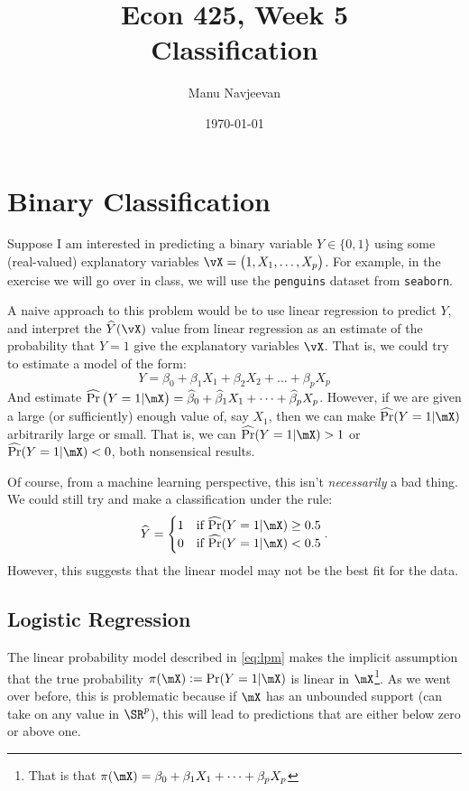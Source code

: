 \documentclass[10pt]{article}
\title{Econ 425, Week 5 \\ \Large Classification}%
\author{Manu Navjeevan}
\date{\today}
\begin{document}
\maketitle

\section{Binary Classification}%
\label{sec:binary}

Suppose I am interested in predicting a binary variable \(Y \in \{0,1\} \) using some (real-valued) explanatory variables \(\vX = \left(1, X_1,\dots,X_p\right)\). For example, in the exercise we will go over in class, we will use the \verb|penguins| dataset from \verb|seaborn|. 

A naive approach to this problem would be to use linear regression to predict \(Y\), and interpret the  \(\widehat Y(\vX)\) value from linear regression as an estimate of the probability that \(Y = 1\) give the explanatory variables \(\vX\). That is, we could try to estimate a model of the form:
\begin{equation}
	\label{eq:lpm}
    Y = \beta_0 + \beta_1 X_1 + \beta_2 X_2 + \dots + \beta_p X_p
\end{equation}
And estimate \(\widehat{\Pr}\left(Y=1|\mX\right) = \widehat{\beta}_0 + \widehat\beta_1X_1 + \dots+\widehat{\beta}_p X_p\). However, if we are given a large (or sufficiently) enough value of, say \(X_1\), then we can make \(\widehat{\Pr}(Y=1|\mX)\) arbitrarily large or small. That is, we can \(\widehat{\Pr}(Y=1|\mX) > 1\) or \(\widehat{\Pr}(Y=1|\mX) < 0\), both nonsensical results.

Of course, from a machine learning perspective, this isn't \textit{necessarily} a bad thing. We could still try and make a classification under the rule:
\[
	\widehat{Y} = \begin{cases}
		1 & \text{if }\widehat{\Pr}(Y=1|\mX)  \geq 0.5\\ 
		0 & \text{if }\widehat{\Pr}(Y=1|\mX) < 0.5
	\end{cases}	
.\] 
However, this suggests that the linear model may not be the best fit for the data.

\subsection{Logistic Regression}%
\label{subsec:logit}

The linear probability model described in \eqref{eq:lpm} makes the implicit assumption that the true probability \(\pi(\mX) := \Pr(Y=1|\mX)\) is linear in \(\mX\)\footnote{That is that \(\pi(\mX) = \beta_0 + \beta_1 X_1 + \dots + \beta_p X_p\)}. As we went over before, this is problematic because if \(\mX\) has an unbounded support (can take on any value in \(\SR^p\)), this will lead to predictions that are either below zero or above one. 
\end{document}
